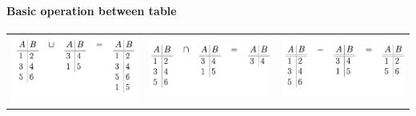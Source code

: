 \documentclass[12pt,a4paper]{article}
\begin{document}
\paragraph{Basic operation between table}

\begin{center}
	\begin{tabular}{c|c|c}
	\includegraphics[scale=0.37]{img/img3.png}&
	\includegraphics[scale=0.46]{img/img4.png}&
	\includegraphics[scale=0.46]{img/img5.png}\\
\end{tabular}
\end{center}
\end{document}
